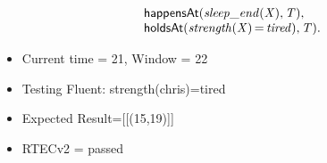 \documentclass[8pt]{beamer}
\DeclareMathOperator{\val}{=}  %
\def \patsize {}
\def\happensAt{\textsf{\patsize happensAt}}
\def\holdsAt{\textsf{\patsize holdsAt}}
\newenvironment{mysplit}%
  {\arraycolsep 0pt \begin{array}{l}}%
  {\end{array}}
\begin{document}
\begin{frame}
\begin{minipage}{0.55\linewidth}
\begin{align*}
\begin{mysplit}
                \quad    \happensAt\mathit{(sleep\_end(X),T),}\\
                \quad    \holdsAt\mathit{(strength(X)\val tired),T).}\\
            \end{mysplit}
        \end{align*}
    \end{minipage}
    \begin{itemize}
        \item Current time = 21, Window = 22
        \item Testing Fluent: strength(chris)=tired
        \item Expected Result=[[(15,19)]]
        \item RTECv2 = passed
    \end{itemize}
\end{frame}
\end{document}
